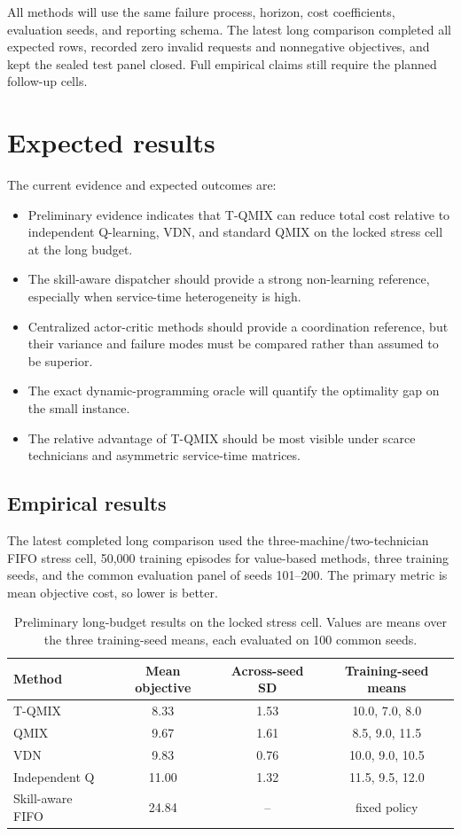\documentclass[11pt]{article}
\begin{document}
All methods will use the same failure process, horizon, cost coefficients, evaluation seeds, and reporting schema. The latest long comparison completed all expected rows, recorded zero invalid requests and nonnegative objectives, and kept the sealed test panel closed. Full empirical claims still require the planned follow-up cells.

\section{Expected results}

The current evidence and expected outcomes are:

\begin{itemize}[leftmargin=*]
    \item Preliminary evidence indicates that T-QMIX can reduce total cost relative to independent Q-learning, VDN, and standard QMIX on the locked stress cell at the long budget.
    \item The skill-aware dispatcher should provide a strong non-learning reference, especially when service-time heterogeneity is high.
    \item Centralized actor-critic methods should provide a coordination reference, but their variance and failure modes must be compared rather than assumed to be superior.
    \item The exact dynamic-programming oracle will quantify the optimality gap on the small instance.
    \item The relative advantage of T-QMIX should be most visible under scarce technicians and asymmetric service-time matrices.
\end{itemize}

\subsection{Empirical results}

The latest completed long comparison used the three-machine/two-technician FIFO stress cell, 50,000 training episodes for value-based methods, three training seeds, and the common evaluation panel of seeds 101--200. The primary metric is mean objective cost, so lower is better.

\begin{table}[ht]
\centering
\small
\caption{Preliminary long-budget results on the locked stress cell. Values are means over the three training-seed means, each evaluated on 100 common seeds.}
\label{tab:preliminary-results}
\begin{tabular}{lccc}
\toprule
Method & Mean objective & Across-seed SD & Training-seed means \\
\midrule
T-QMIX & 8.33 & 1.53 & 10.0, 7.0, 8.0 \\
QMIX & 9.67 & 1.61 & 8.5, 9.0, 11.5 \\
VDN & 9.83 & 0.76 & 10.0, 9.0, 10.5 \\
Independent Q & 11.00 & 1.32 & 11.5, 9.5, 12.0 \\
Skill-aware FIFO & 24.84 & -- & fixed policy \\
\bottomrule
\end{tabular}
\end{table}
\end{document}
